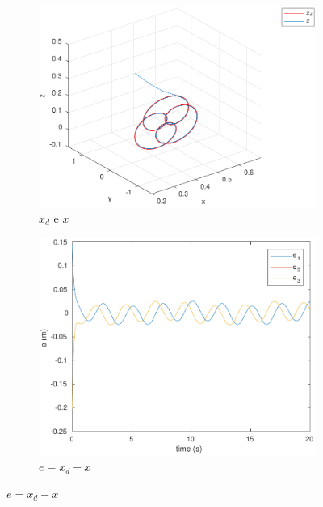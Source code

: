 \documentclass[a4paper,11pt]{article}
\theoremstyle{mytheor}
\begin{document}
\begin{figure}[!ht]
\centering
  \begin{minipage}{\linewidth}
  \centering
    \begin{subfigure}[b]{1\textwidth}
    \includegraphics[width=1\textwidth]{figs/ex1_a_2_x.pdf}
    \caption{$x_d$ e $x$}
    \label{fig:ex1_a_2_x}
    \end{subfigure}
  \end{minipage}
  \begin{minipage}{\linewidth}
  \centering
    \begin{subfigure}[b]{0.45\textwidth}
    \includegraphics[width=1\textwidth]{figs/ex1_a_2_e.pdf}
    \caption{$e = x_d - x$}
    \label{fig:ex1_a_2_e}

\end{subfigure}
\end{minipage}
\end{figure}
\end{document}
